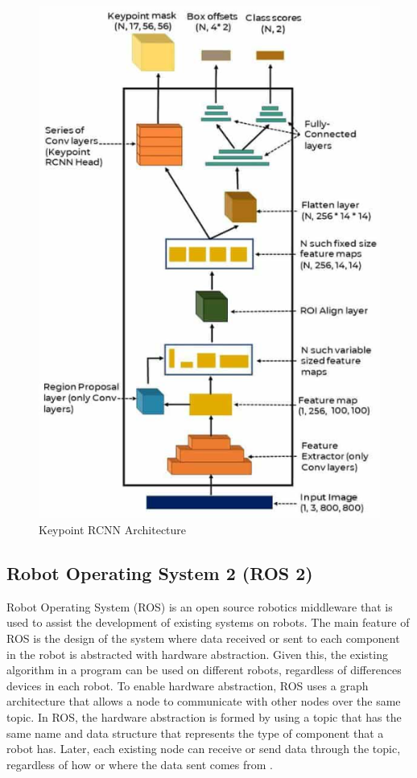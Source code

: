 \begin{figure}[ht]
  \centering
  \includegraphics[scale=0.8]{gambar/keypoint-rcnn-arch.png}
  \caption{Keypoint RCNN Architecture}
  \label{fig:keypoint-rcnn-architecture}
\end{figure}


\subsection{Robot Operating System 2 (ROS 2)}
\label{subsec:ros2}

Robot Operating System (ROS) is an open source robotics middleware that is used to assist the development of existing systems on robots. The main feature of ROS is the design of the system where data received or sent to each component in the robot is abstracted with hardware abstraction.
Given this, the existing algorithm in a program can be used on different robots, regardless of differences devices in each robot. 
To enable hardware abstraction, ROS uses a graph architecture that allows a node to communicate with other nodes over the same topic. In ROS, the hardware abstraction is formed by using a topic that has the same name and data structure that represents the type of component that a robot has.
Later, each existing node can receive or send data through the topic, regardless of how or where the data sent comes from \parencite{fikri2021}.

